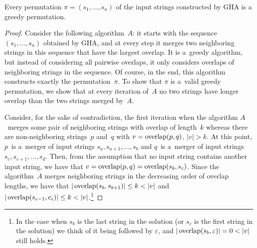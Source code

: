 \begin{theorem}
\label{thm:gr_im_wghc}
Every permutation $\pi=(s_1, \dots, s_n)$ of the input strings constructed by GHA is a greedy permutation.
\end{theorem}
\begin{proof}
Consider the following algorithm~$A$: it starts with the sequence $(s_1, \dots, s_n)$ obtained by GHA, and at every step it merges two neighboring strings in this sequence that have the largest overlap. It is a~greedy algorithm, but instead of considering all pairwise overlaps, it only considers overlaps of neighboring strings in the sequence. Of course, in the end, this algorithm constructs exactly the permutation~$\pi$. To show that $\pi$ is a~valid greedy permutation, we show that at every iteration of~$A$ no two strings have longer overlap than the two strings merged by~$A$.

Consider, for the sake of contradiction, the first iteration when the algorithm $A$~merges some pair of neighboring strings with overlap of length~$k$ whereas there are non-neighboring strings~$p$ and~$q$ with $v=\operatorname{overlap}(p,q)$, $|v|>k$. 
At this point, $p$~is a~merger of input strings $s_a, s_{a+1}, \dotsc, s_b$
and $q$~is a~merger of input strings $s_c, s_{c+1}, \dotsc, s_d$. 
Then, from the assumption that no input string contains another input string, we have that $v=\operatorname{overlap}(p,q)=\operatorname{overlap}(s_b,s_c)$. Since the algorithm~$A$
merges neighboring strings in the decreasing order of overlap lengths, we have that $|\overlap(s_b,s_{b+1})| \le k <|v|$ and $|\operatorname{overlap}(s_{c-1},c_c)| \le k < |v|$.\footnote{In the case when $s_b$ is the last string in the solution (or $s_c$ is the first string in the solution) we think of it being followed by $\varepsilon$, and $|\overlap(s_b,\varepsilon)|=0<|v|$ still holds.} 


\end{proof}
